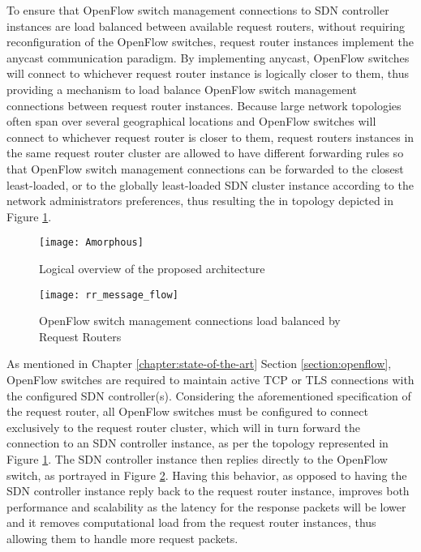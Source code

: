 To ensure that OpenFlow switch management connections to \gls{SDN} controller instances are load balanced between available request routers, without requiring reconfiguration of the OpenFlow switches, request router instances implement the \gls{anycast} communication paradigm.
By implementing \gls{anycast}, OpenFlow switches will connect to whichever request router instance is logically closer to them, thus providing a mechanism to load balance OpenFlow switch management connections between request router instances.
Because large network topologies often span over several geographical locations and OpenFlow switches will connect to whichever request router is closer to them, request routers instances in the same request router cluster are allowed to have different forwarding rules so that OpenFlow switch management connections can be forwarded to the closest least-loaded, or to the globally least-loaded \gls{SDN} cluster instance according to the network administrators preferences, thus resulting the in topology depicted in Figure \ref{fig:Amorphous}.\\
%
\begin{figure}
	\centering
	\texttt{[image: Amorphous]}
	\caption{Logical overview of the proposed architecture}
	\label{fig:Amorphous}
\end{figure}
%
%
\begin{figure}
	\centering
	\texttt{[image: rr\_message\_flow]}
	\caption{OpenFlow switch management connections load balanced by Request Routers}
	\label{fig:rr_message_flow}
\end{figure}
%
As mentioned in Chapter \ref*{chapter:state-of-the-art} Section \ref{section:openflow}, OpenFlow switches are required to maintain active \gls{TCP} or \gls{TLS} connections with the configured \gls{SDN} controller(s).
Considering the aforementioned specification of the request router, all OpenFlow switches must be configured to connect exclusively to the request router cluster, which will in turn forward the connection to an \gls{SDN} controller instance, as per the topology represented in Figure \ref{fig:Amorphous}.
The \gls{SDN} controller instance then replies directly to the OpenFlow switch, as portrayed in Figure \ref{fig:rr_message_flow}.
Having this behavior, as opposed to having the \gls{SDN} controller instance reply back to the request router instance, improves both performance and scalability as the latency for the response packets will be lower and it removes computational load from the request router instances, thus allowing them to handle more request packets.\\
